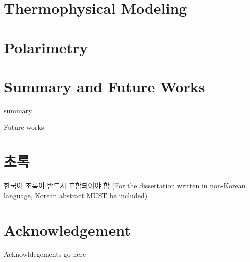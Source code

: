 \documentclass[12pt]{report}
\begin{document}
\chapter{Thermophysical Modeling}\label{c:tpm}



\chapter{Polarimetry}\label{c:pol}


\chapter{Summary and Future Works}
summary 

Future works






\chapter*{초록}\setcounter{page}{3}
한국어 초록이 반드시 포함되어야 함 (For the dissertation written in non-Korean language, Korean abstract MUST be included)



\chapter*{Acknowledgement}
Acknowldegements go here
\end{document}
